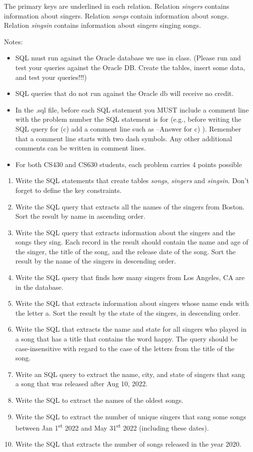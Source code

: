 \documentclass[letterpaper, 11pt]{article}
\begin{document}
The primary keys are underlined in each relation. Relation \textit{singers} contains information about singers. Relation \textit{songs} contain information about songs. Relation \textit{singsin} contains information about singers singing songs.

Notes:
\begin{itemize}
    \item SQL must run against the Oracle database we use in class. (Please run and test your queries against the Oracle DB. Create the tables, insert some data, and test your queries!!!)
    \item SQL queries that do not run against the Oracle db will receive no credit.
    \item In the .sql file, before each SQL statement you MUST include a comment line with the problem number the SQL statement is for (e.g., before writing the SQL query for (c) add a comment line such as --Answer for c) ). Remember that a comment line starts with two dash symbols. Any other additional comments can be written in comment lines.
    \item For both CS430 and CS630 students, each problem carries 4 points possible
\end{itemize}

\begin{enumerate}[label={\alph*})]
    \item Write the SQL statements that create tables \textit{songs}, \textit{singers} and \textit{singsin}. Don’t forget to define the key constraints.
    \item Write the SQL query that extracts all the names of the singers from Boston. Sort the result by name in ascending order.
    \item Write the SQL query that extracts information about the singers and the songs they sing. Each record in the result should contain the name and age of the singer, the title of the song, and the release date of the song. Sort the result by the name of the singers in descending order.
    \item Write the SQL query that finds how many singers from Los Angeles, CA are in the database.
    \item Write the SQL that extracts information about singers whose name ends with the letter a. Sort the result by the state of the singers, in descending order.
    \item Write the SQL that extracts the name and state for all singers who played in a song that has a title that contains the word happy. The query should be case-insensitive with regard to the case of the letters from the title of the song.
    \item Write an SQL query to extract the name, city, and state of singers that sang a song that was released after Aug 10, 2022.
    \item Write the SQL to extract the names of the oldest songs.
    \item Write the SQL to extract the number of unique singers that sang some songs between Jan 1\textsuperscript{st} 2022 and May 31\textsuperscript{st} 2022 (including these dates).
    \item Write the SQL that extracts the number of songs released in the year 2020.
\end{enumerate}
\end{document}
